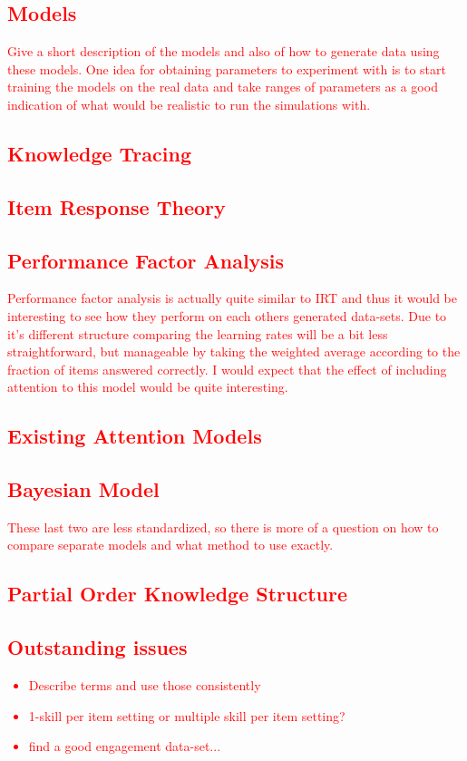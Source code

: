 \documentclass{article}
\newcommand\todo[1]{\textcolor{red}{#1}}
\begin{document}
\todo{
\section{Models}
Give a short description of the models and also of how to generate data using these models. One idea for obtaining parameters to experiment with is to start training the models on the real data and take ranges of parameters as a good indication of what would be realistic to run the simulations with.
\subsection{Knowledge Tracing}
\subsection{Item Response Theory}
\subsection{Performance Factor Analysis}
Performance factor analysis is actually quite similar to IRT and thus it would be interesting to see how they perform on each others generated data-sets. Due to it's different structure comparing the learning rates will be a bit less straightforward, but manageable by taking the weighted average according to the fraction of items answered correctly. I would expect that the effect of including attention to this model would be quite interesting.
\subsection{Existing Attention Models}
\cite{engagement}
\cite{engageproficiency}
\subsection{Bayesian Model}
These last two are less standardized, so there is more of a question on how to compare separate models and what method to use exactly.
\subsection{Partial Order Knowledge Structure}
}
\todo{
\section{Outstanding issues}
\begin{itemize}
\item Describe terms and use those consistently
\item 1-skill per item setting or multiple skill per item setting?
\item find a good engagement data-set...
\end{itemize}
}

\end{document}
